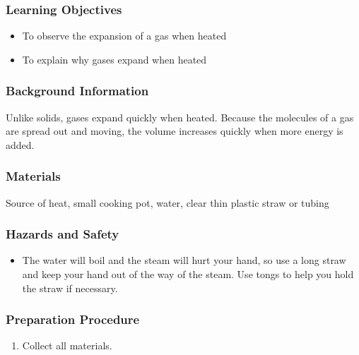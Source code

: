 \subsubsection*{Learning Objectives}
\begin{itemize}
\item{To observe the expansion of a gas when heated} 
\item{To explain why gases expand when heated} 
\end{itemize}

\subsubsection*{Background Information}
Unlike solids, gases expand quickly when heated. Because the molecules of a gas are spread out and moving, the volume increases quickly when more energy is added.  

\subsubsection*{Materials}
Source of heat, small cooking pot, water, clear thin plastic straw or tubing

\subsubsection*{Hazards and Safety}
\begin{itemize}
\item{The water will boil and the steam will hurt your hand, so use a long straw and keep your hand out of the way of the steam. Use tongs to help you hold the straw if necessary.} 
\end{itemize}

\subsubsection*{Preparation Procedure}
\begin{enumerate}
\item{Collect all materials.} 
\end{enumerate}

